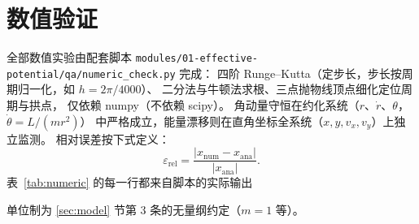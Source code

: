 \documentclass[UTF8,a4paper,11pt]{ctexart}
\begin{document}
\section{数值验证}
\label{sec:numeric}

全部数值实验由配套脚本
\texttt{modules/01-effective-potential/qa/numeric\_check.py} 完成：
四阶 Runge--Kutta（定步长，步长按周期归一化，如 $h=2\pi/4000$）、
二分法与牛顿法求根、三点抛物线顶点细化定位周期与拱点，
仅依赖 numpy（不依赖 scipy）。
角动量守恒在约化系统（$r$、$\dot r$、$\theta$，$\dot\theta=L/(mr^2)$）
中严格成立，能量漂移则在直角坐标全系统（$x,y,v_x,v_y$）上独立监测。
相对误差按下式定义：
\begin{equation}
  \varepsilon_{\mathrm{rel}}
  =\frac{\left|x_{\mathrm{num}}-x_{\mathrm{ana}}\right|}
        {\left|x_{\mathrm{ana}}\right|}.
  \label{eq:relerr}
\end{equation}
表~\ref{tab:numeric} 的每一行都来自脚本的实际输出

单位制为 \ref{sec:model} 节第 3 条的无量纲约定（$m=1$ 等）。
\end{document}
